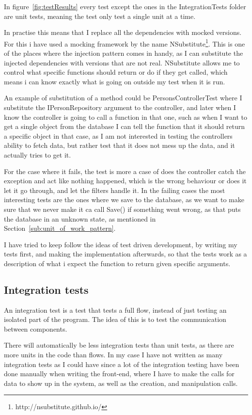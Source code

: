 In figure~\ref{fig:testResults} every test except the ones in the
IntegrationTests folder are unit tests, meaning the test only test a single unit
at a time.

In practise this means that I replace all the dependencies with mocked versions.
For this i have used a mocking framework by the name
NSubstitute\footnote{http://nsubstitute.github.io/}. This is one of the places
where the injection pattern comes in handy, as I can substitute the injected
dependencies with versions that are not real. NSubstitute allows me to control
what specific functions should return or do if they get called, which means i
can know exactly what is going on outside my test when it is run.

An example of substitution of a method could be PersonsControllerTest where I
substitute the IPersonRepository argument to the controller, and later when I
know the controller is going to call a function in that one, such as when I want
to get a single object from the database I can tell the function that it should
return a specific object in that case, as I am not interested in testing the
controllers ability to fetch data, but rather test that it does not mess up the
data, and it actually tries to get it. 

For the case where it fails, the test is more a case of does the controller
catch the exception and act like nothing happened, which is the wrong behaviour
or does it let it go through, and let the filters handle it. In the failing
cases the most interesting tests are the ones where we save to the database, as
we want to make sure that we never make it ca call Save() if something went
wrong, as that puts the database in an unknown state, as mentioned in
Section~\ref{sub:unit_of_work_pattern}.

I have tried to keep follow the ideas of test driven development, by writing my
tests first, and making the implementation afterwards, so that the tests work as
a description of what i expect the function to return given specific arguments.

\subsection{Integration tests}
\label{sec:integration_tests}
An integration test is a test that tests a full flow, instead of just testing an
isolated part of the program. The idea of this is to test the communication
between components.

There will automatically be less integration tests than unit tests, as there are
more units in the code than flows. In my case I have not written as many
integration tests as I could have since a lot of the integration testing have
been done manually when writing the front-end, where I have to make the calls for
data to show up in the system, as well as the creation, and manipulation calls.

